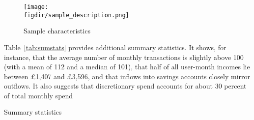 \begin{figure}[H]
    \centering
    \caption{Sample characteristics}
    \texttt{[image: \\figdir/sample\_description.png]}
    \label{fig:sample_description}
\end{figure}

Table~\ref{tab:sumstats} provides additional summary statistics. It shows, for
instance, that the average number of monthly transactions is slightly above 100
(with a mean of 112 and a median of 101), that half of all user-month incomes
lie between \pounds1,407 and \pounds3,596, and that inflows into savings
accounts closely mirror outflows. It also suggests that discretionary
spend accounts for about 30 percent of total monthly spend

\begin{table}[ht]
\centering\tiny
\caption{Summary statistics}
\label{tab:sumstats}

\end{table}

